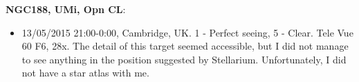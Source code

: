 {\bf NGC188, UMi, Opn CL}:
\begin{itemize}
\item 13/05/2015 21:00-0:00, Cambridge, UK. 1 - Perfect seeing, 5 - Clear. Tele Vue 60 F6, 28x. The detail of this target seemed accessible, but I did not manage to see anything in the position suggested by Stellarium. Unfortunately, I did not have a star atlas with me. 
\end{itemize}
